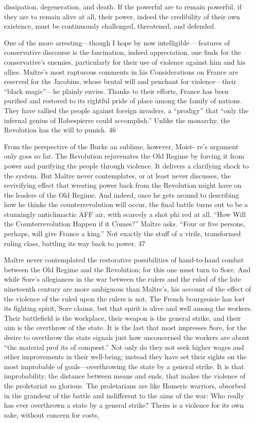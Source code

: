 dissipation, degeneration, and death. If the powerful are to remain powerful, if they are to remain alive at all, their power, indeed the credibility of their own existence, must be continuously challenged, threatened, and defended.{\par} One of the more arresting—though I hope by now intelligible— features of conservative discourse is the fascination, indeed appreciation, one finds for the conservative’s enemies, particularly for their use of violence against him and his allies. Maître’s most rapturous comments in his Considerations on France are reserved for the Jacobins, whose brutal will and penchant for violence—their “black magic”—he plainly envies. Thanks to their efforts, France has been purified and restored to its rightful pride of place among the family of nations. They have rallied the people against foreign invaders, a “prodigy” that “only the infernal genius of Robespierre could accomplish.” Unlike the monarchy, the Revolution has the will to punish. {\color{blue} 46 } {\par} From the perspective of the Burke an sublime, however, Moist- re’s argument only goes so far. The Revolution rejuvenates the Old Regime by forcing it from power and purifying the people through violence. It delivers a clarifying shock to the system. But Maître never contemplates, or at least never discusses, the revivifying effect that wresting power back from the Revolution might have on the leaders of the Old Regime. And indeed, once he gets around to describing how he thinks the counterrevolution will occur, the final battle turns out to be a stunningly anticlimactic AFF air, with scarcely a shot phi red at all. “How Will the Counterrevolution Happen if it Comes?” Maître asks. “Four or five persons, perhaps, will give France a king.” Not exactly the stuff of a virile, transformed ruling class, battling its way back to power. {\color{blue} 47 } {\par} Maître never contemplated the restorative possibilities of hand-to-hand combat between the Old Regime and the Revolution; for this one must turn to Sore. And while Sore’s allegiances in the war between the rulers and the ruled of the late nineteenth century are more ambiguous than Maître’s, his account of the effect of the violence of the ruled upon the rulers is not. The French bourgeoisie has lost its fighting spirit, Sore claims, but that spirit is alive and well among the workers. Their battlefield is the workplace, their weapon is the general strike, and their aim is the overthrow of the state. It is the last that most impresses Sore, for the desire to overthrow the state signals just how unconcerned the workers are about “the material prof its of conquest.” Not only do they not seek higher wages and other improvements in their well-being; instead they have set their sights on the most improbable of goals—overthrowing the state by a general strike. It is that improbability, the distance between means and ends, that makes the violence of the proletariat so glorious. The proletarians are like Homeric warriors, absorbed in the grandeur of the battle and indifferent to the aims of the war: Who really has ever overthrown a state by a general strike? Theirs is a violence for its own sake, without concern for costs, 